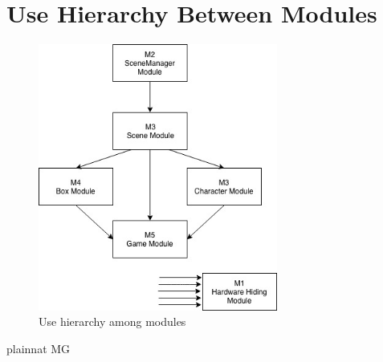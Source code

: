 \documentclass[12pt, titlepage]{article}
\begin{document}
\section{Use Hierarchy Between Modules} \label{SecUse}

\begin{figure}[H]
\centering
\includegraphics[width=0.7\textwidth]{UsesHierarchy.jpg}
\caption{Use hierarchy among modules}
\label{FigUH}
\end{figure}



 {plainnat}
 {MG}
\end{document}
